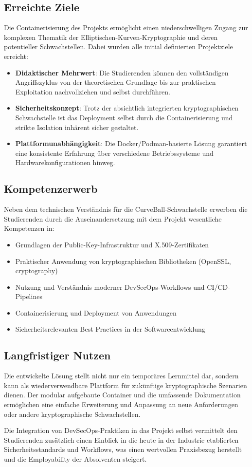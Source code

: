 \documentclass{article}
\begin{document}
\subsection{Erreichte Ziele}
Die Containerisierung des Projekts ermöglicht einen niederschwelligen Zugang zur komplexen Thematik der Elliptischen-Kurven-Kryptographie und deren potentieller Schwachstellen. Dabei wurden alle initial definierten Projektziele erreicht:

\begin{itemize}
  \item \textbf{Didaktischer Mehrwert}: Die Studierenden können den vollständigen Angriffszyklus von der theoretischen Grundlage bis zur praktischen Exploitation nachvollziehen und selbst durchführen.
  
  \item \textbf{Sicherheitskonzept}: Trotz der absichtlich integrierten kryptographischen Schwachstelle ist das Deployment selbst durch die Containerisierung und strikte Isolation inhärent sicher gestaltet.
  
  \item \textbf{Plattformunabhängigkeit}: Die Docker/Podman-basierte Lösung garantiert eine konsistente Erfahrung über verschiedene Betriebssysteme und Hardwarekonfigurationen hinweg.
\end{itemize}

\subsection{Kompetenzerwerb}
Neben dem technischen Verständnis für die CurveBall-Schwachstelle erwerben die Studierenden durch die Auseinandersetzung mit dem Projekt wesentliche Kompetenzen in:

\begin{itemize}
  \item Grundlagen der Public-Key-Infrastruktur und X.509-Zertifikaten
  \item Praktischer Anwendung von kryptographischen Bibliotheken (OpenSSL, cryptography)
  \item Nutzung und Verständnis moderner DevSecOps-Workflows und CI/CD-Pipelines
  \item Containerisierung und Deployment von Anwendungen
  \item Sicherheitsrelevanten Best Practices in der Softwareentwicklung
\end{itemize}

\subsection{Langfristiger Nutzen}
Die entwickelte Lösung stellt nicht nur ein temporäres Lernmittel dar, sondern kann als wiederverwendbare Plattform für zukünftige kryptographische Szenarien dienen. Der modular aufgebaute Container und die umfassende Dokumentation ermöglichen eine einfache Erweiterung und Anpassung an neue Anforderungen oder andere kryptographische Schwachstellen.

Die Integration von DevSecOps-Praktiken in das Projekt selbst vermittelt den Studierenden zusätzlich einen Einblick in die heute in der Industrie etablierten Sicherheitsstandards und Workflows, was einen wertvollen Praxisbezug herstellt und die Employability der Absolventen steigert.
\end{document}
